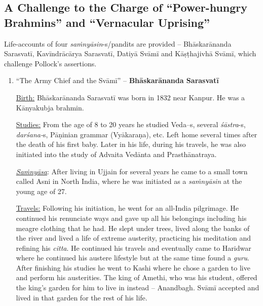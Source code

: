 \subsection*{A Challenge to the Charge of \hfill\break “Power-hungry Brahmins” and “Vernacular Uprising”}

Life-accounts of four \textit{saṁnyāsin}-s/pandits are provided – Bhāskarānanda Sarasvatī, Kavīndrācārya Sarasvatī, Datiyā Svāmī and Kāṣṭhajivhā Svāmī, which challenge Pollock’s assertions.

\begin{enumerate}
\item  “The Army Chief and the Svāmī” – \textbf{Bhāskarānanda Sarasvatī}

 \underline{Birth:} Bhāskarānanda Sarasvatī was born in 1832 near Kanpur. He was a Kānyakubja brahmin.

 \underline{Studies:} From the age of 8 to 20 years he studied Veda--s, several \textit{śāstra}-s, \textit{darśana-}s, Pāṇinian grammar (Vyākaraṇa), etc. Left home several times after the death of his first baby. Later in his life, during his travels, he was also initiated into the study of Advaita Vedānta and Prasthānatraya.

 \textit{\underline{Saṁnyāsa}}: After living in Ujjain for several years he came to a small town called Asni in North India, where he was initiated as a \textit{saṁnyāsin} at the young age of 27.

 \underline{Travels:} Following his initiation, he went for an all-India pilgrimage. He continued his renunciate ways and gave up all his belongings including his meagre clothing that he had. He slept under trees, lived along the banks of the river and lived a life of extreme austerity, practicing his meditation and refining his \textit{citta}. He continued his travels and eventually came to Haridwar where he continued his austere lifestyle but at the same time found a \textit{guru}. After finishing his studies he went to Kashi where he chose a garden to live and perform his austerities. The king of Amethi, who was his student, offered the king’s garden for him to live in instead – Anandbagh. Svāmī accepted and lived in that garden for the rest of his life.


\end{enumerate}
